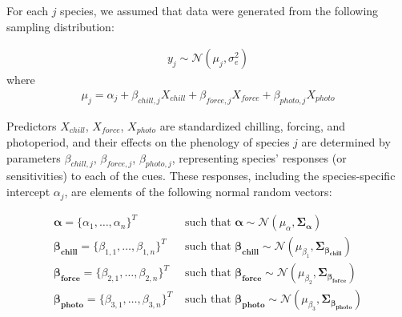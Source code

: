 \documentclass[11pt]{article}
\begin{document}
For each $j$ species, we assumed that data were generated from the following sampling distribution:

\begin{align}
  \label{modely}
  y_j \sim \mathcal{N}(\mu_j, \sigma_e^2)
\end{align}
where
\begin{align}
  \label{modelmu}
  \mu_j = \alpha_j + \beta_{chill,j} X_{chill} + \beta_{force,j} X_{force} + \beta_{photo,j} X_{photo}
\end{align}

Predictors $X_{chill}$, $X_{force}$, $X_{photo}$ are standardized chilling, forcing, and photoperiod, and their effects on the phenology of species $j$ are determined by parameters $\beta_{chill,j}$, $\beta_{force,j}$, $\beta_{photo,j}$, representing species' responses (or sensitivities) to each of the cues. These responses, including the species-specific intercept $\alpha_j$, are elements of the following normal random vectors:

\begin{align}
    \label{phybetas}
  \boldsymbol{\alpha} = \{\alpha_1, \ldots, \alpha_n\}^T & \text{ such that }
  \boldsymbol{\alpha} \sim \mathcal{N}(\mu_{\alpha},\boldsymbol{\Sigma_{\alpha}}) \\
  \boldsymbol{\beta_{chill}} =  \{\beta_{1,1}, \ldots, \beta_{1,n}\}^T & \text{ such that }
  \boldsymbol{\beta_{chill}} \sim \mathcal{N}(\mu_{\beta_1},\boldsymbol{\Sigma_{\beta_{chill}}}) \nonumber \\
  \boldsymbol{\beta_{force}} =  \{\beta_{2,1}, \ldots, \beta_{2,n}\}^T & \text{ such that }
  \boldsymbol{\beta_{force}} \sim \mathcal{N}(\mu_{\beta_2},\boldsymbol{\Sigma_{\beta_{force}}}) \nonumber \\
  \boldsymbol{\beta_{photo}} =  \{\beta_{3,1}, \ldots, \beta_{3,n}\}^T & \text{ such that }
  \boldsymbol{\beta_{photo}} \sim \mathcal{N}(\mu_{\beta_3},\boldsymbol{\Sigma_{\beta_{photo}}}) \nonumber
\end{align}
\end{document}
